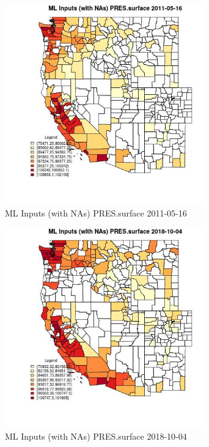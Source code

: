 \begin{figure} 
\centering  
\includegraphics[width=0.77\textwidth]{Code_Outputs/Report_ML_input_PM25_Step4_part_f_de_duplicated_aves_prioritize_24hr_obswNAs_CountyPRESsurfaceMean2011-05-16.jpg} 
\caption{\label{fig:Report_ML_input_PM25_Step4_part_f_de_duplicated_aves_prioritize_24hr_obswNAsCountyPRESsurfaceMean2011-05-16}ML Inputs (with NAs) PRES.surface 2011-05-16} 
\end{figure} 
 

\begin{figure} 
\centering  
\includegraphics[width=0.77\textwidth]{Code_Outputs/Report_ML_input_PM25_Step4_part_f_de_duplicated_aves_prioritize_24hr_obswNAs_CountyPRESsurfaceMean2018-10-04.jpg} 
\caption{\label{fig:Report_ML_input_PM25_Step4_part_f_de_duplicated_aves_prioritize_24hr_obswNAsCountyPRESsurfaceMean2018-10-04}ML Inputs (with NAs) PRES.surface 2018-10-04} 
\end{figure} 
 


